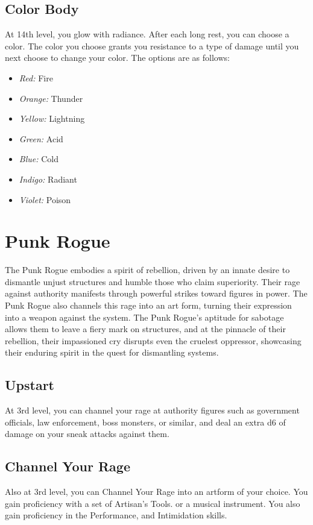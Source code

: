 \subsection{Color Body}
At 14th level, you glow with radiance. After each long rest, you can choose a color. The color you choose grants you resistance to a type of damage until you next choose to change your color. The options are as follows:
\begin{itemize}
    \item \textit{Red:} Fire
    \item \textit{Orange:} Thunder
    \item \textit{Yellow:} Lightning
    \item \textit{Green:} Acid
    \item \textit{Blue:} Cold
    \item \textit{Indigo:} Radiant
    \item \textit{Violet:} Poison
\end{itemize}
\section{Punk Rogue}\label{Punk}
The Punk Rogue embodies a spirit of rebellion, driven by an innate desire to dismantle unjust structures and humble those who claim superiority. Their rage against authority manifests through powerful strikes toward figures in power. The Punk Rogue also channels this rage into an art form, turning their expression into a weapon against the system. The Punk Rogue's aptitude for sabotage allows them to leave a fiery mark on structures, and at the pinnacle of their rebellion, their impassioned cry disrupts even the cruelest oppressor, showcasing their enduring spirit in the quest for dismantling systems.
\subsection{Upstart}
At 3rd level, you can channel your rage at authority figures such as government officials, law enforcement, boss monsters, or similar, and deal an extra d6 of damage on your sneak attacks against them.
\subsection{Channel Your Rage}
Also at 3rd level, you can Channel Your Rage into an artform of your choice. You gain proficiency with a set of Artisan's Tools. or a musical instrument. You also gain proficiency in the Performance, and Intimidation skills.
